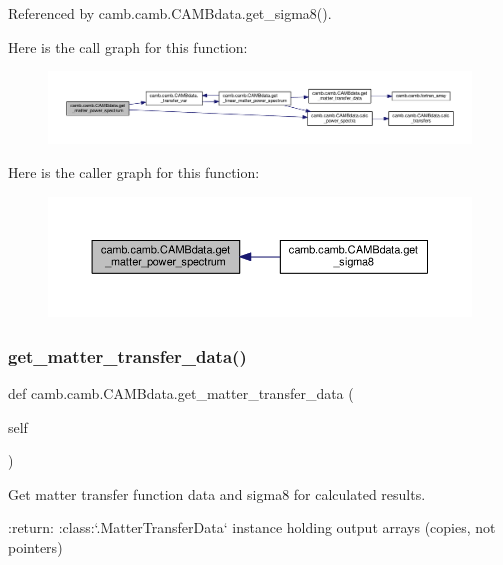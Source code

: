 Referenced by camb.\+camb.\+C\+A\+M\+Bdata.\+get\+\_\+sigma8().

Here is the call graph for this function\+:
\nopagebreak
\begin{figure}[H]
\begin{center}
\leavevmode
\includegraphics[width=350pt]{classcamb_1_1camb_1_1CAMBdata_ab18c1f8670933c20948c80ecf6d89fbf_cgraph}
\end{center}
\end{figure}
Here is the caller graph for this function\+:
\nopagebreak
\begin{figure}[H]
\begin{center}
\leavevmode
\includegraphics[width=350pt]{classcamb_1_1camb_1_1CAMBdata_ab18c1f8670933c20948c80ecf6d89fbf_icgraph}
\end{center}
\end{figure}
\mbox{\label{classcamb_1_1camb_1_1CAMBdata_a81d01bc1ae174319453f1e3565f2dfda}} 
\subsubsection{\texorpdfstring{get\+\_\+matter\+\_\+transfer\+\_\+data()}{get\_matter\_transfer\_data()}}
{\footnotesize\ttfamily def camb.\+camb.\+C\+A\+M\+Bdata.\+get\+\_\+matter\+\_\+transfer\+\_\+data (\begin{DoxyParamCaption}\item[{}]{self }\end{DoxyParamCaption})}

\begin{DoxyVerb}Get matter transfer function data and sigma8 for calculated results.

:return: :class:`.MatterTransferData` instance holding output arrays (copies, not pointers)
\end{DoxyVerb}
 

